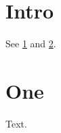 \documentclass{IEEEojcsys}
\begin{document}
\section{Intro}\label{s:intro}
See \cref{s:intro} and \cref{a:one}.
\appendices
\section{One}\label{a:one}
Text.
\end{document}
